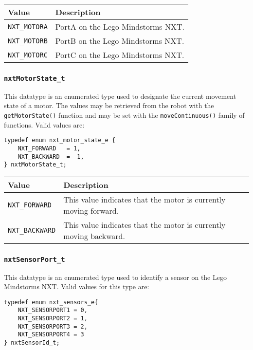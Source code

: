 \noindent
\begin{longtable}{p{3.5cm}p{12cm}} 
    \hline 
    Value & Description \\
    \hline 
    {\tt NXT\_MOTORA} & PortA on the Lego Mindstorms NXT. \\
    {\tt NXT\_MOTORB} & PortB on the Lego Mindstorms NXT. \\
    {\tt NXT\_MOTORC} & PortC on the Lego Mindstorms NXT. \\
    \hline
\end{longtable}

\subsubsection{\label{sec:nxtMotorState_t}{\tt nxtMotorState\_t}}
This datatype is an enumerated type used to designate the current 
movement state of a motor. The values may be retrieved from the 
robot with the {\tt getMotorState()} function and may be set 
with the {\tt moveContinuous()} family of functions. Valid values are:
\begin{lstlisting}
typedef enum nxt_motor_state_e {
    NXT_FORWARD   = 1,
    NXT_BACKWARD  = -1,
} nxtMotorState_t;
\end{lstlisting}

\noindent
\begin{longtable}{p{3.5cm}p{12cm}}
    \hline
    Value & Description \\
    \hline
    {\tt NXT\_FORWARD} & This value indicates that the motor is currently moving forward.  \\
{\tt NXT\_BACKWARD}& This value indicates that the motor is currently moving backward. \\
    \hline
\end{longtable}

\subsubsection{\label{sec:nxtSensorPort_t}{\tt nxtSensorPort\_t}}
This datatype is an enumerated type used to identify a sensor on 
the Lego Mindstorms NXT. Valid values for this type are:
\begin{lstlisting}
typedef enum nxt_sensors_e{
    NXT_SENSORPORT1 = 0,
    NXT_SENSORPORT2 = 1,
    NXT_SENSORPORT3 = 2,
    NXT_SENSORPORT4 = 3
} nxtSensorId_t;
\end{lstlisting}

